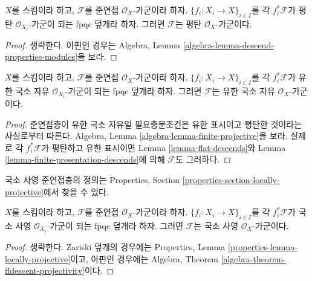 \begin{lemma}
\label{lemma-flat-descends}
$X$를 스킴이라 하고, $\mathcal{F}$를 준연접 $\mathcal{O}_X$-가군이라
하자. $\{f_i : X_i \to X\}_{i \in I}$를 각 $f_i^*\mathcal{F}$가 평탄
$\mathcal{O}_{X_i}$-가군이 되는 fpqc 덮개라 하자. 그러면 $\mathcal{F}$는
평탄 $\mathcal{O}_X$-가군이다.
\end{lemma}

\begin{proof}
생략한다. 아핀인 경우는 Algebra, Lemma
\ref{algebra-lemma-descend-properties-modules}을 보라.
\end{proof}

\begin{lemma}
\label{lemma-finite-locally-free-descends}
$X$를 스킴이라 하고, $\mathcal{F}$를 준연접 $\mathcal{O}_X$-가군이라
하자. $\{f_i : X_i \to X\}_{i \in I}$를 각 $f_i^*\mathcal{F}$가 유한
국소 자유 $\mathcal{O}_{X_i}$-가군이 되는 fpqc 덮개라 하자. 그러면
$\mathcal{F}$는 유한 국소 자유 $\mathcal{O}_X$-가군이다.
\end{lemma}

\begin{proof}
준연접층이 유한 국소 자유일 필요충분조건은 유한 표시이고 평탄한 것이라는
사실로부터 따른다. Algebra, Lemma
\ref{algebra-lemma-finite-projective}을 보라. 실제로 각
$f_i^*\mathcal{F}$가 평탄하고 유한 표시이면 Lemma
\ref{lemma-flat-descends}와 Lemma
\ref{lemma-finite-presentation-descends}에 의해 $\mathcal{F}$도 그러하다.
\end{proof}

\noindent
국소 사영 준연접층의 정의는 Properties, Section
\ref{properties-section-locally-projective}에서 찾을 수 있다.

\begin{lemma}
\label{lemma-locally-projective-descends}
$X$를 스킴이라 하고, $\mathcal{F}$를 준연접 $\mathcal{O}_X$-가군이라
하자. $\{f_i : X_i \to X\}_{i \in I}$를 각 $f_i^*\mathcal{F}$가 국소
사영 $\mathcal{O}_{X_i}$-가군이 되는 fpqc 덮개라 하자. 그러면
$\mathcal{F}$는 국소 사영 $\mathcal{O}_X$-가군이다.
\end{lemma}

\begin{proof}
생략한다. Zariski 덮개의 경우에는 Properties, Lemma
\ref{properties-lemma-locally-projective}이고, 아핀인 경우에는 Algebra,
Theorem \ref{algebra-theorem-ffdescent-projectivity}이다.
\end{proof}

